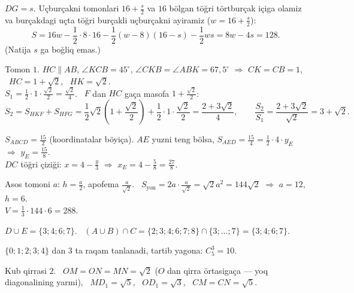 $DG=s$. Uçburçakni tomonlari $16+\frac s2$ va $16$ bölgan töğri törtburçak içiga olamiz va burçakdagi uçta töğri burçakli uçburçakni ayiramiz ($w=16+\frac s2$):
\[S=16w-\frac12\cdot8\cdot16-\frac12(w-8)(16-s)-\frac12ws=8w-4s=128.\]
(Natija $s$ ga boğliq emas.)

Tomon $1$. $HC\parallel AB$, $\angle KCB=45^\circ$, $\angle CKB=\angle ABK=67{,}5^\circ$ $\Rightarrow$ $CK=CB=1$, \ $HC=1+\sqrt2$, \ $HK=\sqrt2$.\\
$S_1=\frac12\cdot1\cdot\frac{\sqrt2}2=\frac{\sqrt2}4$. \ $F$ dan $HC$ gaça masofa $1+\frac{\sqrt2}2$:
\[S_2=S_{HKF}+S_{HFG}=\frac12\sqrt2\left(1+\frac{\sqrt2}2\right)+\frac12\cdot1\cdot\frac{\sqrt2}2=\frac{2+3\sqrt2}4,\qquad\frac{S_2}{S_1}=\frac{2+3\sqrt2}{\sqrt2}=3+\sqrt2.\]

$S_{ABCD}=\frac{15}2$ (koordinatalar böyiça). $AE$ yuzni teng bölsa, $S_{AED}=\frac{15}4=\frac12\cdot4\cdot y_E$ $\Rightarrow$ $y_E=\frac{15}8$.\\
$DC$ töğri çiziği: $x=4-\frac y3$ $\Rightarrow$ $x_E=4-\frac58=\frac{27}8$.

Asos tomoni $a$: $h=\frac a2$, apofema $\frac a{\sqrt2}$. \ $S_{\text{yon}}=2a\cdot\frac a{\sqrt2}=\sqrt2a^2=144\sqrt2$ $\Rightarrow$ $a=12$, $h=6$.\\
$V=\frac13\cdot144\cdot6=288$.

$D\cup E=\{3;4;6;7\}$. \ $(A\cup B)\cap C=\{2;3;4;6;7;8\}\cap\{3;\dots;7\}=\{3;4;6;7\}$.

$\{0;1;2;3;4\}$ dan $3$ ta raqam tanlanadi, tartib yagona: $C_5^3=10$.

\newpage
{}
Kub qirrasi $2$. \ $OM=ON=MN=\sqrt2$ ($O$ dan qirra örtasigaça — yoq diagonalining yarmi), \ $MD_1=\sqrt5$, \ $OD_1=\sqrt3$, \ $CM=CN=\sqrt5$.


